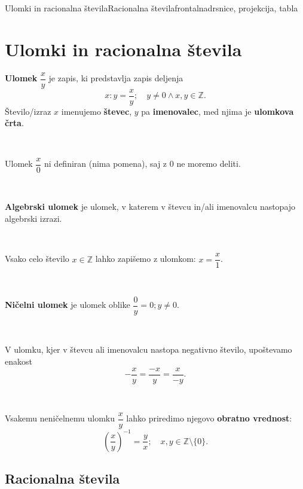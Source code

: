 \begin{priprava}{1}{}{Ulomki in racionalna števila}{Racionalna števila}{frontalna}{drsnice, projekcija, tabla}

    \section{Ulomki in racionalna števila}

        
            
                \textbf{Ulomek} $\dfrac{x}{y}$ je zapis, ki predstavlja zapis deljenja 
                $$x:y=\dfrac{x}{y};\quad y\neq 0\land x,y\in\mathbb{Z}.$$
                Število/izraz $x$ imenujemo \textbf{števec}, $y$ pa \textbf{imenovalec}, med njima je \textbf{ulomkova črta}.
            
                ~
            
                Ulomek $\dfrac{x}{0}$ ni definiran (nima pomena), saj z $0$ ne moremo deliti.
            
                ~
            
                \textbf{Algebrski ulomek} je ulomek, v katerem v števcu in/ali imenovalcu nastopajo algebrski izrazi.
            
                ~
            
                Vsako celo število $x\in\mathbb{Z}$ lahko zapišemo z ulomkom: $x=\dfrac{x}{1}$.
            
                ~
            
                \textbf{Ničelni ulomek} je ulomek oblike $\dfrac{0}{y}=0; y\neq 0$.
            
                ~
            
                V ulomku, kjer v števcu ali imenovalcu nastopa negativno število, upoštevamo enakost 
                $$-\dfrac{x}{y}=\dfrac{-x}{y}=\dfrac{x}{-y}.$$
            
                ~
            
                Vsakemu neničelnemu ulomku $\dfrac{x}{y}$ lahko priredimo njegovo \textbf{obratno vrednost}:
                $$\left(\dfrac{x}{y}\right)^{-1}=\dfrac{y}{x}; \quad x,y\in\mathbb{Z}\setminus\{0\}.$$
            

        


        
            \subsection*{Racionalna števila}


\end{priprava}
